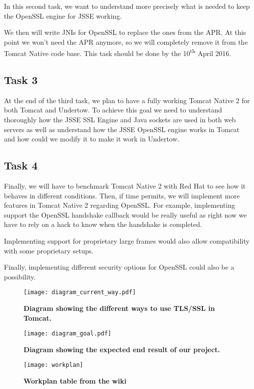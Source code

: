\documentclass[11pt,a4paper,bibliography=totocnumbered]{scrartcl}
\def\mytitle{Tomcat Native 2}
\begin{document}
In this second task, we want to understand more precisely what is needed to keep the OpenSSL engine for JSSE working.

We then will write JNIs for OpenSSL to replace the ones from the APR. At this point we won't need the APR anymore, so we will completely remove it from the Tomcat Native code base. This task should be done by the 10\textsuperscript{th} April 2016.

\subsection{Task 3}
\label{subsec:task3}

At the end of the third task, we plan to have a fully working \mytitle{} for both Tomcat and Undertow. To achieve this goal we need to understand thoroughly how the JSSE SSL Engine and Java sockets are used in both web servers as well as understand how the JSSE OpenSSL engine works in Tomcat and how could we modify it to make it work in Undertow.

\subsection{Task 4}
\label{subsec:task4}

Finally, we will have to benchmark \mytitle{} with Red Hat to see how it behaves in different conditions. Then, if time permits, we will implement more features in \mytitle{} regarding OpenSSL. For example, implementing support the OpenSSL handshake callback would be really useful as right now we have to rely on a hack to know when the handshake is completed.

Implementing support for proprietary large frames would also allow compatibility with some proprietary setups.

Finally, implementing different security options for OpenSSL could also be a possibility.
\newpage
\printbibliography

\begin{figure}[!h]
\begin{center}
\texttt{[image: diagram\_current\_way.pdf]}
\end{center}
\caption{\textbf{Diagram showing the different ways to use TLS/SSL in Tomcat.}}
\label{fig:current}
\end{figure}

\begin{figure}[!h]
\begin{center}
\texttt{[image: diagram\_goal.pdf]}
\end{center}
\caption{\textbf{Diagram showing the expected end result of our project.}}
\label{fig:goal}
\end{figure}


\begin{figure}[h!]
\begin{center}
\texttt{[image: workplan]}
\end{center}
\caption{\textbf{Workplan table from the wiki}}
\label{fig:workplan}
\end{figure}

\FloatBarrier
\end{document}
